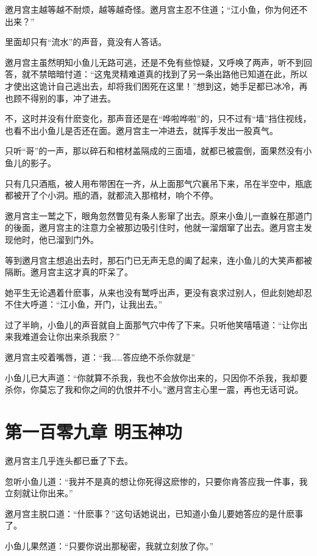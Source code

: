 \documentclass[12pt,oneside]{book}
\begin{document}
邀月宫主越等越不耐烦，越等越奇怪。邀月宫主忍不住道；``江小鱼，你为何还不出来？''

里面却只有``流水''的声音，竟没有人答话。

邀月宫主虽然明知小鱼儿无路可逃，还是不免有些惊疑，又呼唤了两声，听不到回答，就不禁暗暗忖道：``这鬼灵精难道真的找到了另一条出路他已知道在此，所以才使出这诡计自己逃出去，却将我们困死在这里！''想到这，她手足都已冰冷，再也顾不得别的事，冲了进去。

不，这时并没有什麽变化，那声音还是在``哗啦哗啦''的，只不过有``墙''挡住视线，也看不出小鱼儿是否还在面。邀月宫主一冲进去，就挥手发出一股真气。

只听``哥''的一声，那以碎石和棺材盖隔成的三面墙，就都已被震倒，面果然没有小鱼儿的影子。

只有几只酒瓶，被人用布带困在一齐，从上面那气穴襄吊下来，吊在半空中，瓶底都被开了个小洞。瓶的酒，就都流入那棺材，响个不停。

邀月宫主一鹫之下，眼角忽然瞥见有条人影窜了出去。原来小鱼儿一直躲在那道门的後面，邀月宫主的注意力全被那边吸引住时，他就一溜烟窜了出去。邀月宫主发现他时，他已溜到门外。

等到邀月宫主想追出去时，那石门已无声无息的阖了起来，连小鱼儿的大笑声都被隔断。邀月宫主这才真的吓呆了。

她平生无论遇着什麽事，从来也没有鹫呼出声，更没有哀求过别人，但此刻她却忍不住大呼道：``江小鱼，开门，让我出去。''

过了半晌，小鱼儿的声音就自上面那气穴中传了下来。只听他笑嘻嘻道：``让你出来我难道会让你出来杀我麽？''

邀月宫主咬着嘴唇，道：``我\ldots\ldots 答应绝不杀你就是''

小鱼儿已大声道：``你就算不杀我，我也不会放你出来的，只因你不杀我，我却要杀你，你莫忘了我和你之间的仇恨并不小。''邀月宫主心里一震，再也无话可说。

\hypertarget{ux7b2cux4e00ux767eux96f6ux4e5dux7ae0-ux660eux7389ux795eux529f}{%
\chapter{第一百零九章
明玉神功}\label{ux7b2cux4e00ux767eux96f6ux4e5dux7ae0-ux660eux7389ux795eux529f}}

邀月宫主几乎连头都已垂了下去。

忽听小鱼儿道：``我并不是真的想让你死得这麽惨的，只要你肯答应我一件事，我立刻就让你出来。''

邀月宫主脱口道：``什麽事？''这句话她说出，已知道小鱼儿要她答应的是什麽事了。

小鱼儿果然道：``只要你说出那秘密，我就立刻放了你。''
\end{document}
